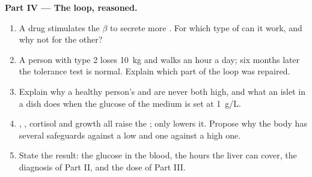 \begin{problem}
\medskip
\noindent\textbf{Part IV --- The loop, reasoned.}
\begin{enumerate}[resume]
  \item A drug stimulates the $\beta$  to secrete more .
        For which type of  can it work, and why not for the
        other?
  \item A person with type 2 loses \qty{10}{kg} and walks an hour a
        day; six months later the tolerance test is normal. Explain
        which part of the loop was repaired.
  \item Explain why a healthy person's  and  are never
        both high, and what an islet in a dish does when the glucose
        of the medium is set at \qty{1}{g/L}.
  \item {}, , cortisol and growth  all raise
        the ; only  lowers it. Propose why the body
        has several safeguards against a low  and one against
        a high one.
  \item State the result: the glucose in the blood, the hours the
        liver can cover, the diagnosis of Part II, and the dose of
        Part III.
\end{enumerate}
\end{problem}
